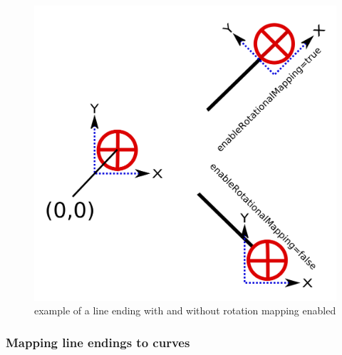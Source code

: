 \begin{figure}[!ht]
\begin{center}
\includegraphics[scale=0.15]{figures/EnableRotationalMapping.png}
\end{center}
\caption{example of a line ending with and without rotation mapping enabled}
\label{EnableRotationalMapping}
\end{figure}


\subsubsection{Mapping line endings to curves}


